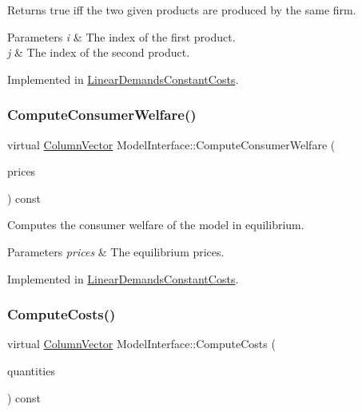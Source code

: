 Returns true iff the two given products are produced by the same firm.


\begin{DoxyParams}{Parameters}
{\em i} & The index of the first product. \\
\hline
{\em j} & The index of the second product. \\
\hline
\end{DoxyParams}


Implemented in \hyperlink{classLinearDemandsConstantCosts_a91ba117b740d0e5cb5d6efd63d61a5f6}{Linear\+Demands\+Constant\+Costs}.

\mbox{\label{classModelInterface_a094ebb85618fb13bf38f6faff1f5dd7b}} 
\subsubsection{\texorpdfstring{Compute\+Consumer\+Welfare()}{ComputeConsumerWelfare()}}
{\footnotesize\ttfamily virtual \hyperlink{classColumnVector}{Column\+Vector} Model\+Interface\+::\+Compute\+Consumer\+Welfare (\begin{DoxyParamCaption}\item[{\hyperlink{classColumnVector}{Column\+Vector} const \&}]{prices }\end{DoxyParamCaption}) const\hspace{0.3cm}{\ttfamily [pure virtual]}}

Computes the consumer welfare of the model in equilibrium.


\begin{DoxyParams}{Parameters}
{\em prices} & The equilibrium prices. \\
\hline
\end{DoxyParams}


Implemented in \hyperlink{classLinearDemandsConstantCosts_a9d3fa6a3b151c2f1703f23bbee6954cb}{Linear\+Demands\+Constant\+Costs}.

\mbox{\label{classModelInterface_ac0a7cc3db9fc177dc75f16abf00275a7}} 
\subsubsection{\texorpdfstring{Compute\+Costs()}{ComputeCosts()}}
{\footnotesize\ttfamily virtual \hyperlink{classColumnVector}{Column\+Vector} Model\+Interface\+::\+Compute\+Costs (\begin{DoxyParamCaption}\item[{\hyperlink{classColumnVector}{Column\+Vector} const \&}]{quantities }\end{DoxyParamCaption}) const\hspace{0.3cm}{\ttfamily [pure virtual]}}

